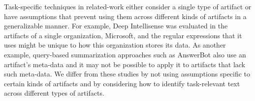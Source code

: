 Task-specific techniques in related-work either consider a single type of artifact
or have assumptions that prevent using them across different kinds of artifacts 
in a generalizable manner. For example, 
Deep Intellisense was evaluated in the artifacts of a single organization, 
Microsoft, and the regular expressions that it uses might be unique to 
how this organization stores its data. As another example, 
query-based summarization approaches such as AnswerBot also use 
an artifact's meta-data and it may not be possible to apply it 
to artifacts that lack such meta-data. 
We differ from these studies 
by not using assumptions 
specific to certain kinds of artifacts
and by considering how to identify task-relevant text 
across different types of artifacts.

















